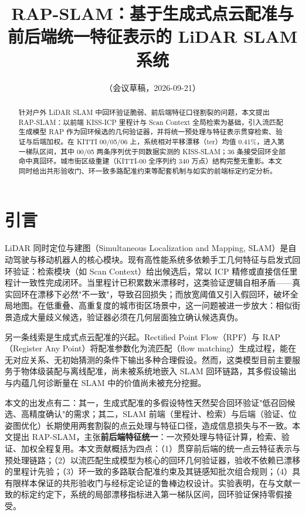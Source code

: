 \documentclass[UTF8,12pt]{ctexart}
\title{RAP-SLAM：基于生成式点云配准与前后端统一特征表示的 LiDAR SLAM 系统}
\author{（会议草稿，2026-09-21）}
\date{}
\begin{document}
\maketitle

\begin{abstract}
针对户外 LiDAR SLAM 中回环验证脆弱、前后端特征口径割裂的问题，本文提出 RAP-SLAM：以前端 KISS-ICP 里程计与 Scan Context 全局检索为基础，引入流匹配生成模型 RAP 作为回环候选的几何验证器，并将统一预处理与特征表示贯穿检索、验证与后端加权。在 KITTI 00/05/06 上，系统相对平移漂移（ter）均值 0.41\%，进入第一梯队区间，其中 00/05 两条序列优于同数据实测的 KISS-SLAM；36 条接受回环全部命中真回环。城市街区级重建（KITTI-00 全序列约 340 万点）结构完整无重影。本文同时给出共形验收门、环一致多路配准约束等配套机制与如实的前端标定约定分析。
\end{abstract}

\section{引言}
LiDAR 同时定位与建图（Simultaneous Localization and Mapping, SLAM）是自动驾驶与移动机器人的核心模块。现有高性能系统多依赖手工几何特征与启发式回环验证：检索模块（如 Scan Context）给出候选后，常以 ICP 精修或直接信任里程计一致性完成闭环。当里程计已积累数米漂移时，这类验证逻辑自相矛盾——真实回环在漂移下必然"不一致"，导致召回损失；而放宽阈值又引入假回环，破坏全局地图。在低重叠、高重复度的城市街区场景中，这一问题被进一步放大：相似街景造成大量歧义候选，验证器必须在几何层面独立确认候选真伪。

另一条线索是生成式点云配准的兴起。Rectified Point Flow（RPF）与 RAP（Register Any Point）将配准参数化为流匹配（flow matching）生成过程，能在无对应关系、无初始猜测的条件下输出多种合理假设。然而，这类模型目前主要服务于物体级装配与离线配准，尚未被系统地嵌入 SLAM 回环链路，其多假设输出与内蕴几何诊断量在 SLAM 中的价值尚未被充分挖掘。

本文的出发点有二：其一，生成式配准的多假设特性天然契合回环验证"低召回候选、高精度确认"的需求；其二，SLAM 前端（里程计、检索）与后端（验证、位姿图优化）长期使用两套割裂的点云处理与特征口径，造成信息损失与不一致。本文提出 RAP-SLAM，主张\textbf{前后端特征统一}：一次预处理与特征计算，检索、验证、加权全程复用。本文贡献概括为四点：（1）贯穿前后端的统一点云特征表示与预处理链路；（2）以流匹配生成模型为核心的回环几何验证器，验收不依赖已漂移的里程计先验；（3）环一致的多路联合配准约束及其链感知批次组合规则；（4）具有限样本保证的共形验收门与经标定论证的鲁棒边权设计。实验表明，在与文献一致的标定约定下，系统的局部漂移指标进入第一梯队区间，回环验证保持零假接受。
\end{document}
